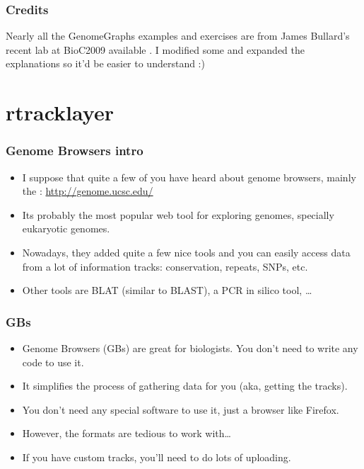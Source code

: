 \begin{frame}[allowframebreaks]
  \frametitle{Credits}
  Nearly all the GenomeGraphs examples and exercises are from James Bullard's recent lab at BioC2009 available . I modified some and expanded the explanations so it'd be easier to understand :)
\end{frame}

\section{rtracklayer}

\begin{frame}[allowframebreaks]
  \frametitle{Genome Browsers intro}
  \begin{itemize}
  \item I suppose that quite a few of you have heard about genome browsers, mainly the : \url{http://genome.ucsc.edu/}
  \item Its probably the most popular web tool for exploring genomes, specially eukaryotic genomes.
  \item Nowadays, they added quite a few nice tools and you can easily access data from a lot of information tracks: conservation, repeats, SNPs, etc.
  \item Other tools are BLAT (similar to BLAST), a PCR in silico tool, \ldots
  \end{itemize}
\end{frame}

\begin{frame}[allowframebreaks]
  \frametitle{GBs}
  \begin{itemize}
  \item Genome Browsers (GBs) are great for biologists. You don't need to write any code to use it.
  \item It simplifies the process of gathering data for you (aka, getting the tracks).
  \item You don't need any special software to use it, just a browser like Firefox.
  \item However, the formats are tedious to work with\ldots
  \item If you have custom tracks, you'll need to do lots of uploading.
  \end{itemize}
\end{frame}

